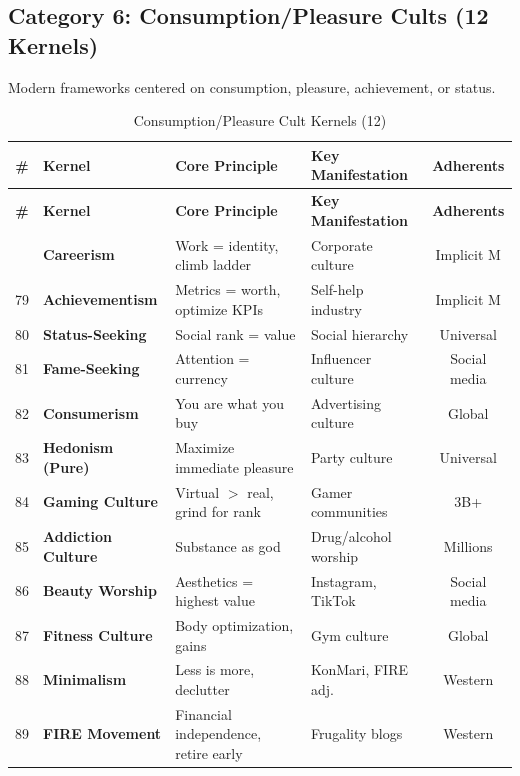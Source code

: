 \documentclass[11pt,a4paper]{article}
\theoremstyle{definition}
\theoremstyle{remark}
\begin{document}
\subsection{Category 6: Consumption/Pleasure Cults (12 Kernels)}

Modern frameworks centered on consumption, pleasure, achievement, or status.

\begin{longtable}{@{}clp{4cm}p{3.5cm}c@{}}
\caption{Consumption/Pleasure Cult Kernels (12)} \label{tab:consumption-kernels} \\
\toprule
\textbf{\#} & \textbf{Kernel} & \textbf{Core Principle} & \textbf{Key Manifestation} & \textbf{Adherents} \\
\midrule
\endfirsthead
\toprule
\textbf{\#} & \textbf{Kernel} & \textbf{Core Principle} & \textbf{Key Manifestation} & \textbf{Adherents} \\
\midrule
\endhead
\bottomrule
\endlastfoot
78 & \textbf{Careerism} & Work = identity, climb ladder & Corporate culture & Implicit M \\
79 & \textbf{Achievementism} & Metrics = worth, optimize KPIs & Self-help industry & Implicit M \\
80 & \textbf{Status-Seeking} & Social rank = value & Social hierarchy & Universal \\
81 & \textbf{Fame-Seeking} & Attention = currency & Influencer culture & Social media \\
82 & \textbf{Consumerism} & You are what you buy & Advertising culture & Global \\
83 & \textbf{Hedonism (Pure)} & Maximize immediate pleasure & Party culture & Universal \\
84 & \textbf{Gaming Culture} & Virtual $>$ real, grind for rank & Gamer communities & 3B+ \\
85 & \textbf{Addiction Culture} & Substance as god & Drug/alcohol worship & Millions \\
86 & \textbf{Beauty Worship} & Aesthetics = highest value & Instagram, TikTok & Social media \\
87 & \textbf{Fitness Culture} & Body optimization, gains & Gym culture & Global \\
88 & \textbf{Minimalism} & Less is more, declutter & KonMari, FIRE adj. & Western \\
89 & \textbf{FIRE Movement} & Financial independence, retire early & Frugality blogs & Western \\
\end{longtable}
\end{document}
